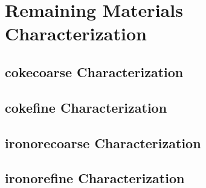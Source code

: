 









\section{Remaining Materials Characterization}
\label{sec:remainingmaterialscharacterization}




\subsection{cokecoarse Characterization}
\label{subsec:cokecoarsecharacterization}

\lipsum[1]






\subsection{cokefine Characterization}
\label{subsec:cokefinecharacterization}

\lipsum[1]







\subsection{ironorecoarse Characterization}
\label{subsec:ironorecoarsecharacterization}

\lipsum[1]






\subsection{ironorefine Characterization}
\label{subsec:ironorefinecharacterization}

